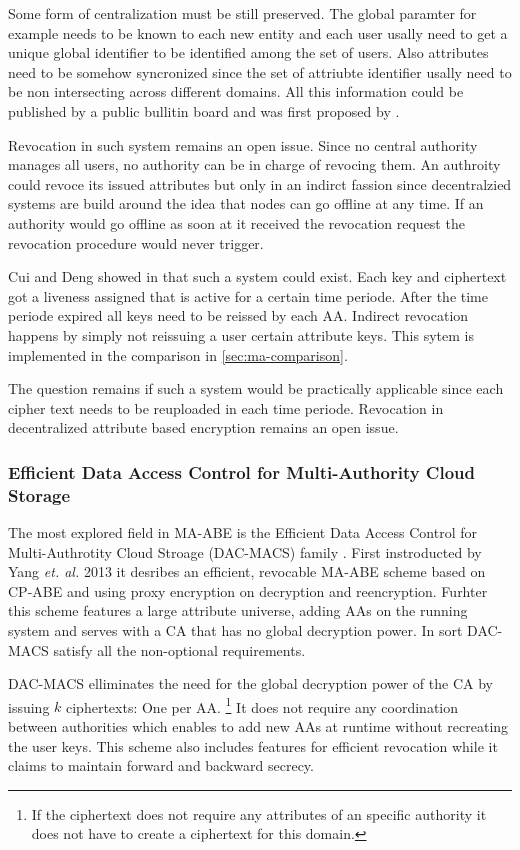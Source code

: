 Some form of centralization must be still preserved. The global paramter for example needs to be known to each new entity and each user usally need to get a unique global identifier to be identified among the set of users. Also attributes need to be somehow syncronized since the set of attriubte identifier usally need to be non intersecting across different domains. All this information could be published by a public bullitin board and was first proposed by \cite{lewko2011decentralizing}. 

Revocation in such system remains an open issue. Since no central authority manages all users, no authority can be in charge of revocing them. An authroity could revoce its issued attributes but only in an indirct fassion since decentralzied systems are build around the idea that nodes can go offline at any time. If an authority would go offline as soon at it received the revocation request the revocation procedure would never trigger. 

Cui and Deng showed in \cite{cui2016revocable} that such a system could exist. Each key and ciphertext got a liveness assigned that is active for a certain time periode. After the time periode expired all keys need to be reissed by each AA. Indirect revocation happens by simply not reissuing a user certain attribute keys. This sytem is implemented in the comparison in \ref{sec:ma-comparison}.

The question remains if such a system would be practically applicable since each cipher text needs to be reuploaded in each time periode. Revocation in decentralized attribute based encryption remains an open issue.

\subsubsection{Efficient Data Access Control for Multi-Authority Cloud Storage}
The most explored field in MA-ABE is the Efficient Data Access Control for Multi-Authrotity Cloud Stroage (DAC-MACS) family \cite{yang2013dac}. First instroducted by Yang \textit{et. al.} 2013 it desribes an efficient, revocable MA-ABE scheme based on CP-ABE and using proxy encryption on decryption and reencryption. Furhter this scheme features a large attribute universe, adding AAs on the running system and serves with a CA that has no global decryption power. In sort DAC-MACS satisfy all the non-optional requirements.

DAC-MACS elliminates the need for the global decryption power of the CA by issuing $k$ ciphertexts: One per AA. \footnote{If the ciphertext does not require any attributes of an specific authority it does not have to create a ciphertext for this domain.} It does not require any coordination between authorities which enables to add new AAs at runtime without recreating the user keys. This scheme also includes features for efficient revocation while it claims to maintain forward and backward secrecy.

